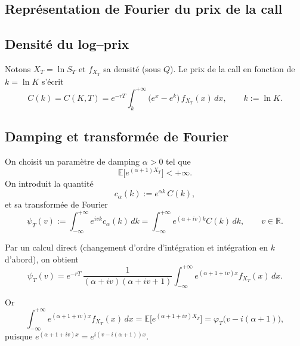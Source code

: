 \documentclass[11pt,a4paper]{article}
\newcommand{\1}{\mathbf{1}}
\begin{document}
\subsection{Repr\'esentation de Fourier du prix de la call}

\subsection{Densit\'e du log--prix}

Notons $X_T=\ln S_T$ et $f_{X_T}$ sa densit\'e (sous $Q$). Le prix de la call
en fonction de $k=\ln K$ s'\'ecrit
\begin{equation}
C(k) = C(K,T) = e^{-rT}\int_k^{+\infty}\big(e^x-e^k\big)\,f_{X_T}(x)\,dx,
\qquad k:=\ln K.
\end{equation}

\subsection{Damping et transform\'ee de Fourier}

On choisit un param\`etre de damping $\alpha>0$ tel que
\begin{equation}
\mathbb{E}\big[e^{(\alpha+1)X_T}\big] < +\infty.
\end{equation}
On introduit la quantit\'e
\begin{equation}
c_\alpha(k) := e^{\alpha k}\,C(k),
\end{equation}
et sa transform\'ee de Fourier
\begin{equation}
\psi_T(v) := \int_{-\infty}^{+\infty} e^{ivk} c_\alpha(k)\,dk
           = \int_{-\infty}^{+\infty} e^{(\alpha+iv)k} C(k)\,dk,
           \qquad v\in\mathbb{R}.
\end{equation}

Par un calcul direct (changement d'ordre d'int\'egration et int\'egration en
$k$ d'abord), on obtient
\begin{equation}
\psi_T(v)
= e^{-rT}\,\frac{1}{(\alpha+iv)(\alpha+iv+1)}
      \int_{-\infty}^{+\infty} e^{(\alpha+1+iv)x}f_{X_T}(x)\,dx.
\end{equation}

Or
\begin{equation}
\int_{-\infty}^{+\infty} e^{(\alpha+1+iv)x}f_{X_T}(x)\,dx
= \mathbb{E}\big[e^{(\alpha+1+iv)X_T}\big]
= \varphi_T\big( v - i(\alpha+1)\big),
\end{equation}
puisque
$e^{(\alpha+1+iv)x} = e^{i(v-i(\alpha+1))x}$.
\end{document}
